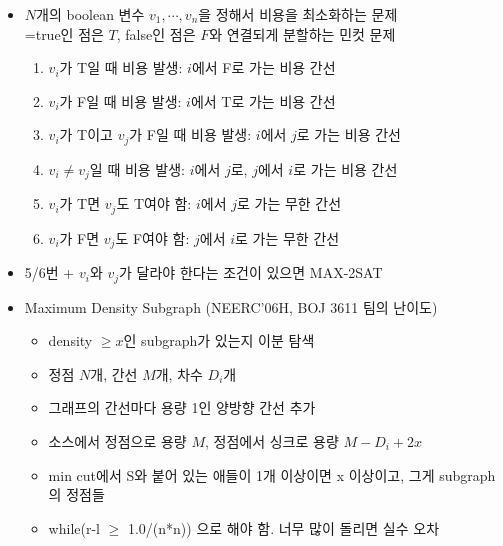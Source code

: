 \begin{itemize}[noitemsep]
    \item $N$개의 boolean 변수 $v_1, \cdots, v_n$을 정해서 비용을 최소화하는 문제\\=true인 점은 $T$, false인 점은 $F$와 연결되게 분할하는 민컷 문제
    \begin{enumerate}[noitemsep]
        \item $v_i$가 T일 때 비용 발생: $i$에서 F로 가는 비용 간선
        \item $v_i$가 F일 때 비용 발생: $i$에서 T로 가는 비용 간선
        \item $v_i$가 T이고 $v_j$가 F일 때 비용 발생: $i$에서 $j$로 가는 비용 간선
        \item $v_i \ne v_j$일 때 비용 발생: $i$에서 $j$로, $j$에서 $i$로 가는 비용 간선
        \item $v_i$가 T면 $v_j$도 T여야 함: $i$에서 $j$로 가는 무한 간선
        \item $v_i$가 F면 $v_j$도 F여야 함: $j$에서 $i$로 가는 무한 간선
    \end{enumerate}
    \item 5/6번 + $v_i$와 $v_j$가 달라야 한다는 조건이 있으면 MAX-2SAT
    \item Maximum Density Subgraph (NEERC'06H, BOJ 3611 팀의 난이도)
    \begin{itemize}[noitemsep]
        \item density $\geq x$인 subgraph가 있는지 이분 탐색
        \item 정점 $N$개, 간선 $M$개, 차수 $D_i$개
        \item 그래프의 간선마다 용량 1인 양방향 간선 추가
        \item 소스에서 정점으로 용량 $M$, 정점에서 싱크로 용량 $M-D_i+2x$
        \item min cut에서 S와 붙어 있는 애들이 1개 이상이면 x 이상이고, 그게 subgraph의 정점들
        \item while(r-l $\geq$ 1.0/(n*n)) 으로 해야 함. 너무 많이 돌리면 실수 오차
    \end{itemize}
\end{itemize}
